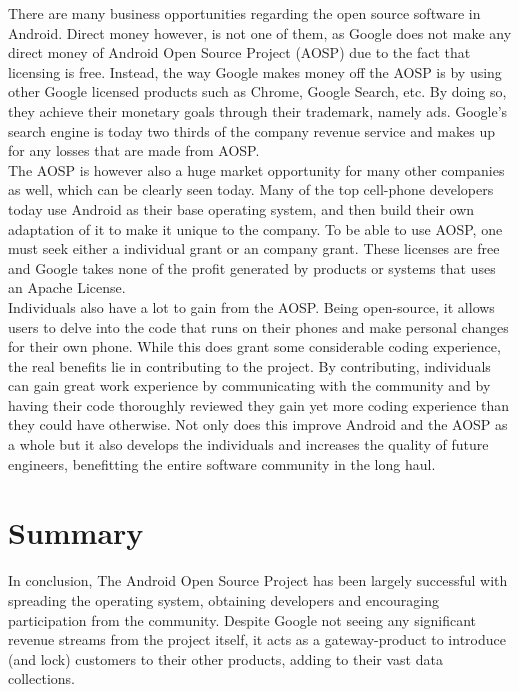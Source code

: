 \documentclass[conference]{IEEEtran}
\begin{document}
There are many business opportunities regarding the open source software in Android. Direct money however, is not one of them, as Google does not make any direct money of Android Open Source Project (AOSP) due to the fact that licensing is free.\cite{Money} Instead, the way Google makes money off the AOSP is by using other Google licensed products such as Chrome, Google Search, etc. By doing so, they achieve their monetary goals through their trademark, namely ads. Google's search engine is today two thirds of the company revenue service and makes up for any losses that are made from AOSP.\cite{requires citation!} 
\\The AOSP is however also a huge market opportunity for many other companies as well, which can be clearly seen today. Many of the top cell-phone developers today use Android as their base operating system, and then build their own adaptation of it to make it unique to the company. To be able to use AOSP, one must seek either a individual grant or an company grant.\cite{android-licenses} These licenses are free and Google takes none of the profit generated by products or systems that uses an Apache License.
\\Individuals also have a lot to gain from the AOSP. Being open-source, it allows users to delve into the code that runs on their phones and make personal changes for their own phone. While this does grant some considerable coding experience, the real benefits lie in contributing to the project. By contributing, individuals can gain great work experience by communicating with the community and by having their code thoroughly reviewed they gain yet more coding experience than they could have otherwise. Not only does this improve Android and the AOSP as a whole but it also develops the individuals and increases the quality of future engineers, benefitting the entire software community in the long haul. 


\section{Summary}
\label{summary}

In conclusion, The Android Open Source Project has been largely successful with spreading the operating system, obtaining developers and encouraging participation from the community. Despite Google not seeing any significant revenue streams from the project itself, it acts as a gateway-product to introduce (and lock) customers to their other products, adding to their vast data collections.
\end{document}

